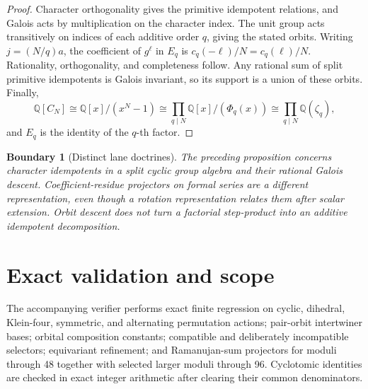 \documentclass[11pt]{article}
\newtheorem{boundary}[theorem]{Boundary}
\begin{document}
\begin{proof}
Character orthogonality gives the primitive idempotent relations, and Galois acts by multiplication on the character index.  The unit group acts transitively on indices of each additive order \(q\), giving the stated orbits.  Writing \(j=(N/q)a\), the coefficient of \(g^\ell\) in \(E_q\) is \(c_q(-\ell)/N=c_q(\ell)/N\).  Rationality, orthogonality, and completeness follow.  Any rational sum of split primitive idempotents is Galois invariant, so its support is a union of these orbits.  Finally,
\[
 \mathbb Q[C_N]
 \cong\mathbb Q[x]/(x^N-1)
 \cong\prod_{q\mid N}\mathbb Q[x]/(\Phi_q(x))
 \cong\prod_{q\mid N}\mathbb Q(\zeta_q),
\]
and \(E_q\) is the identity of the \(q\)-th factor.
\end{proof}

\begin{boundary}[Distinct lane doctrines]
The preceding proposition concerns character idempotents in a split cyclic group algebra and their rational Galois descent.  Coefficient-residue projectors on formal series are a different representation, even though a rotation representation relates them after scalar extension.  Orbit descent does not turn a factorial step-product into an additive idempotent decomposition.
\end{boundary}

\section{Exact validation and scope}

The accompanying verifier performs exact finite regression on cyclic, dihedral, Klein-four, symmetric, and alternating permutation actions; pair-orbit intertwiner bases; orbital composition constants; compatible and deliberately incompatible selectors; equivariant refinement; and Ramanujan-sum projectors for moduli through 48 together with selected larger moduli through 96.  Cyclotomic identities are checked in exact integer arithmetic after clearing their common denominators.
\end{document}
